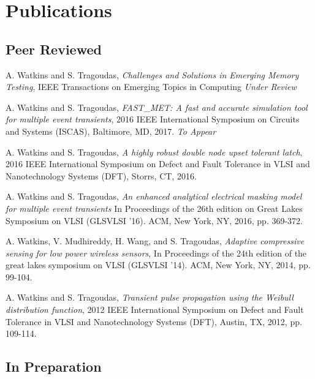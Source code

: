 \documentclass[letterpaper]{article}
\renewenvironment{itemize}{
  \begin{list}{}{
    \setlength{\leftmargin}{1.5em}
  }
}{
  \end{list}
}
\begin{document}
\section*{Publications}

\subsection*{Peer Reviewed}

\begin{itemize}
\item A. Watkins and S. Tragoudas, \emph{Challenges and Solutions in Emerging Memory Testing}, IEEE Transactions on Emerging Topics in Computing \emph{Under Review}

\item A. Watkins and S. Tragoudas, \emph{FAST\_MET: A fast and accurate simulation tool for multiple event transients}, 2016 IEEE International Symposium on Circuits and Systems (ISCAS), Baltimore, MD, 2017. \emph{To Appear}
	
\item A. Watkins and S. Tragoudas, \emph{A highly robust double node upset tolerant latch}, 2016 IEEE International Symposium on Defect and Fault Tolerance in VLSI and Nanotechnology Systems (DFT), Storrs, CT, 2016.
	
\item A. Watkins and S. Tragoudas, \emph{An enhanced analytical electrical masking model for multiple event transients} In Proceedings of the 26th edition on Great Lakes Symposium on VLSI (GLSVLSI '16). ACM, New York, NY, 2016, pp. 369-372.
	
\item A. Watkins, V. Mudhireddy, H. Wang, and S. Tragoudas, \emph{Adaptive compressive sensing for low power wireless sensors}, In Proceedings of the 24th edition of the great lakes symposium on VLSI (GLSVLSI '14). ACM, New York, NY, 2014, pp. 99-104.
	
\item A. Watkins and S. Tragoudas, \emph{Transient pulse propagation using the Weibull distribution function}, 2012 IEEE International Symposium on Defect and Fault Tolerance in VLSI and Nanotechnology Systems (DFT), Austin, TX, 2012, pp. 109-114.
\end{itemize}

\subsection*{In Preparation}
\end{document}
